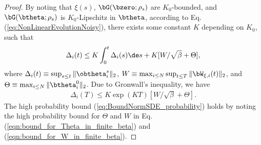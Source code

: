 \documentclass[11pt]{article}
\begin{document}
\begin{proof}
By noting that $\xi(s)$, $\bG(\bzero; \rho_s)$ are $K_0$-bounded, and $\bG(\btheta; \rho_s)$ is $K_0$-Lipschitz in $\btheta$, according to Eq. (\ref{eq:NonLinearEvolutionNoisy}), there exists some constant $K$ depending on $K_0$, such that
\[
\begin{aligned}
\Delta_i(t) \le K \int_0^t \Delta_i(s) \de s + K [W /\sqrt{\beta}+ \Theta],
\end{aligned}
\]
where $\Delta_i(t) \equiv \sup_{s \le t} \| \obtheta_i^s\|_2$, $W \equiv \max_{i \le N}\sup_{t \le T} \| \bW_{\xi, i}(t) \|_2$, and $\Theta \equiv \max_{i \le N}\| \btheta_i^0 \|_2$. Due to Gronwall's inequality, we have
\[
\begin{aligned}
\Delta_i(T) \le K \exp(KT) [W / \sqrt{\beta} + \Theta]. 
\end{aligned}
\]
The high probability bound (\ref{eq:BoundNormSDE_probability}) holds by noting the high probability bound for $\Theta$ and $W$ in Eq. (\ref{eqn:bound_for_Theta_in_finite_beta}) and (\ref{eqn:bound_for_W_in_finite_beta}). 



\end{proof}
\end{document}
